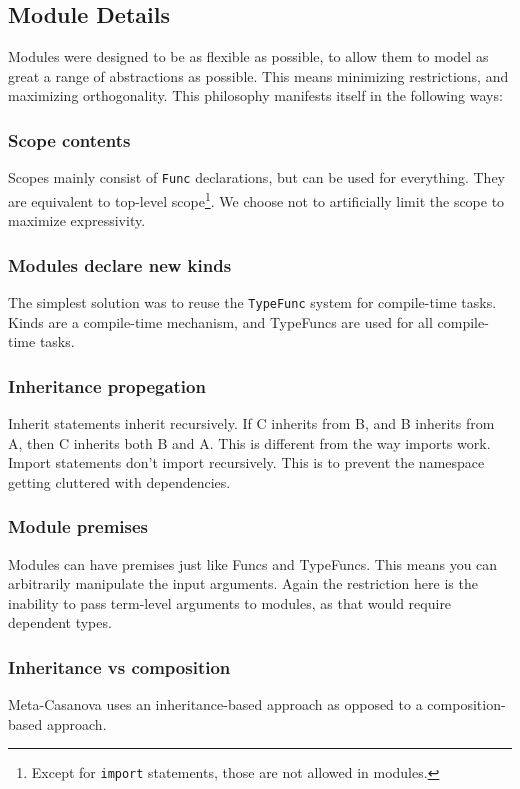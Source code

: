 \subsection{Module Details}
Modules were designed to be as flexible as possible, to allow them to model as great a range of abstractions as possible.
This means minimizing restrictions, and maximizing orthogonality.
This philosophy manifests itself in the following ways:

\subsubsection*{Scope contents}
Scopes mainly consist of \texttt{Func} declarations, but can be used for everything.
They are equivalent to top-level scope\footnote{Except for \texttt{import} statements, those are not allowed in modules.}. 
We choose not to artificially limit the scope to maximize expressivity.

\subsubsection*{Modules declare new kinds}
The simplest solution was to reuse the \texttt{TypeFunc} system for compile-time tasks.
Kinds are a compile-time mechanism, and TypeFuncs are used for all compile-time tasks.

\subsubsection*{Inheritance propegation}
Inherit statements inherit recursively.
If C inherits from B, and B inherits from A, then C inherits both B and A.
This is different from the way imports work.
Import statements don't import recursively.
This is to prevent the namespace getting cluttered with dependencies.

\subsubsection*{Module premises}
Modules can have premises just like Funcs and TypeFuncs.
This means you can arbitrarily manipulate the input arguments.
Again the restriction here is the inability to pass term-level arguments to modules, as that would require dependent types.

\subsubsection*{Inheritance vs composition}
Meta-Casanova uses an inheritance-based approach as opposed to a composition-based approach.

